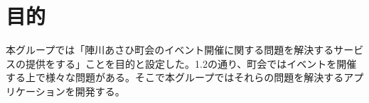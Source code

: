 \chapter{目的}
本グループでは「陣川あさひ町会のイベント開催に関する問題を解決するサービスの提供をする」ことを目的と設定した。1.2の通り、町会ではイベントを開催する上で様々な問題がある。そこで本グループではそれらの問題を解決するアプリケーションを開発する。
